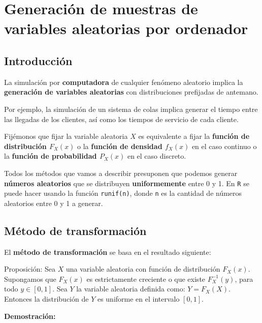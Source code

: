 \documentclass[]{book}
\begin{document}
\hypertarget{generaciuxf3n-de-muestras-de-variables-aleatorias-por-ordenador}{%
\section{Generación de muestras de variables aleatorias por ordenador}\label{generaciuxf3n-de-muestras-de-variables-aleatorias-por-ordenador}}

\hypertarget{introducciuxf3n-2}{%
\subsection{Introducción}\label{introducciuxf3n-2}}

La simulación por \textbf{computadora} de cualquier fenómeno aleatorio implica la \textbf{generación de variables aleatorias} con distribuciones prefijadas de antemano.

Por ejemplo, la simulación de un sistema de colas implica generar el tiempo entre las llegadas de los clientes, así como los tiempos de servicio de cada cliente.

Fijémonos que fijar la variable aleatoria \(X\) es equivalente a fijar la \textbf{función de distribución \(F_X(x)\)} o la \textbf{función de densidad \(f_X(x)\)} en el caso continuo o la \textbf{función de probabilidad \(P_X(x)\)} en el caso discreto.

Todos los métodos que vamos a describir presuponen que podemos generar \textbf{números aleatorios} que se distribuyen \textbf{uniformemente} entre 0 y 1. En \texttt{R} se puede hacer usando la función \texttt{runif(n)}, donde \texttt{n} es la cantidad de números aleatorios entre 0 y 1 a generar.

\hypertarget{muxe9todo-de-transformaciuxf3n}{%
\subsection{Método de transformación}\label{muxe9todo-de-transformaciuxf3n}}

El \textbf{método de transformación} se basa en el resultado siguiente:

Proposición:
Sea \(X\) una variable aleatoria con función de distribución \(F_X(x)\). Supongamos que \(F_X(x)\) es estrictamente creciente o que existe \(F_X^{-1}(y)\), para todo \(y\in [0,1]\). Sea \(Y\) la variable aleatoria definida como: \(Y=F_X(X)\). Entonces la distribución de \(Y\) es uniforme en el intervalo \([0,1]\).

\textbf{Demostración:}
\end{document}
